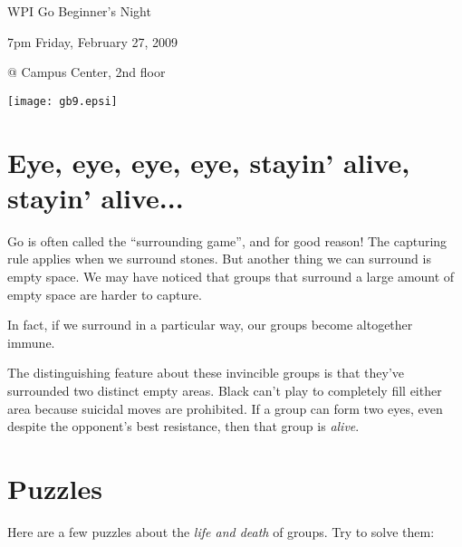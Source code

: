 \documentclass{article}
\begin{document}
\centerline{\Huge WPI Go Beginner's Night}
\centerline{\Huge 7pm Friday, February 27, 2009}
\centerline{\Huge @ Campus Center, 2nd floor}
\vfill

\begin{center}
\texttt{[image: gb9.epsi]}
\end{center}

\vfill

\newpage

\section*{Eye, eye, eye, eye, stayin' alive, stayin' alive...}

Go is often called the ``surrounding game'', and for good reason!  The
capturing rule applies when we surround stones.  But another thing we
can surround is empty space.  We may have noticed that groups that
surround a large amount of empty space are harder to capture.

In fact, if we surround in a particular way, our groups
become altogether immune.
\begin{center}
\shortstack{
\cleargoban
\showgoban
}
\shortstack{
\cleargoban
\showgoban
}
\end{center}
The distinguishing feature about these invincible groups is that
they've surrounded two distinct empty areas.  Black can't play to
completely fill either area because suicidal moves are prohibited.  If
a group can form two eyes, even despite the opponent's best
resistance, then that group is \emph{alive}.


\section*{Puzzles}
Here are a few puzzles about the \emph{life and death} of groups.  Try to
solve them:
\begin{center}




\hspace{.3in}
\hspace{.3in}
\end{center}
\end{document}
